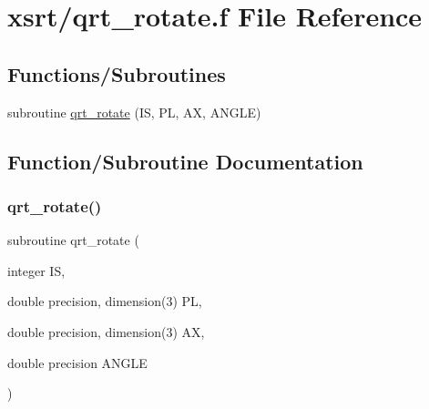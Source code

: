 \hypertarget{qrt__rotate_8f}{}\section{xsrt/qrt\+\_\+rotate.f File Reference}
\label{qrt__rotate_8f}
\subsection*{Functions/\+Subroutines}
\begin{DoxyCompactItemize}
\item 
subroutine \hyperlink{qrt__rotate_8f_a816e6613044c28e33b65d6c9d514f243}{qrt\+\_\+rotate} (IS, PL, AX, A\+N\+G\+LE)
\end{DoxyCompactItemize}


\subsection{Function/\+Subroutine Documentation}
\mbox{\label{qrt__rotate_8f_a816e6613044c28e33b65d6c9d514f243}} 
\subsubsection{\texorpdfstring{qrt\+\_\+rotate()}{qrt\_rotate()}}
{\footnotesize\ttfamily subroutine qrt\+\_\+rotate (\begin{DoxyParamCaption}\item[{integer}]{IS,  }\item[{double precision, dimension(3)}]{PL,  }\item[{double precision, dimension(3)}]{AX,  }\item[{double precision}]{A\+N\+G\+LE }\end{DoxyParamCaption})}

